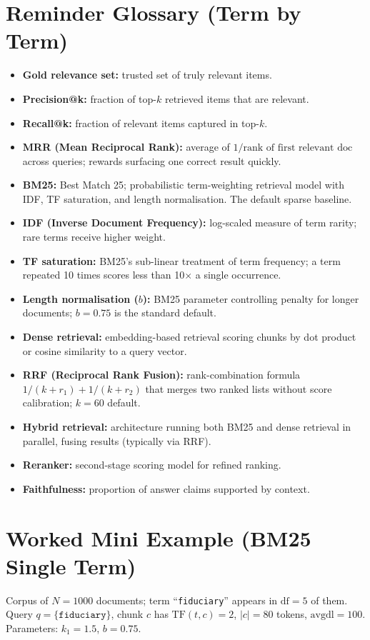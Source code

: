 \section*{Reminder Glossary (Term by Term)}
\begin{itemize}[leftmargin=1.5em]
  \item \textbf{Gold relevance set:} trusted set of truly relevant items.
  \item \textbf{Precision@k:} fraction of top-$k$ retrieved items that are relevant.
  \item \textbf{Recall@k:} fraction of relevant items captured in top-$k$.
  \item \textbf{MRR (Mean Reciprocal Rank):} average of $1/\text{rank of first relevant doc}$ across queries; rewards surfacing one correct result quickly.
  \item \textbf{BM25:} Best Match 25; probabilistic term-weighting retrieval model with IDF, TF saturation, and length normalisation. The default sparse baseline.
  \item \textbf{IDF (Inverse Document Frequency):} log-scaled measure of term rarity; rare terms receive higher weight.
  \item \textbf{TF saturation:} BM25's sub-linear treatment of term frequency; a term repeated 10 times scores less than 10$\times$ a single occurrence.
  \item \textbf{Length normalisation ($b$):} BM25 parameter controlling penalty for longer documents; $b=0.75$ is the standard default.
  \item \textbf{Dense retrieval:} embedding-based retrieval scoring chunks by dot product or cosine similarity to a query vector.
  \item \textbf{RRF (Reciprocal Rank Fusion):} rank-combination formula $1/(k+r_1) + 1/(k+r_2)$ that merges two ranked lists without score calibration; $k=60$ default.
  \item \textbf{Hybrid retrieval:} architecture running both BM25 and dense retrieval in parallel, fusing results (typically via RRF).
  \item \textbf{Reranker:} second-stage scoring model for refined ranking.
  \item \textbf{Faithfulness:} proportion of answer claims supported by context.
\end{itemize}

\section*{Worked Mini Example (BM25 Single Term)}
Corpus of $N=1000$ documents; term ``\texttt{fiduciary}'' appears in $\mathrm{df}=5$ of them. Query $q=\{\texttt{fiduciary}\}$, chunk $c$ has $\mathrm{TF}(t,c)=2$, $|c|=80$ tokens, $\mathrm{avgdl}=100$. Parameters: $k_1=1.5$, $b=0.75$.

